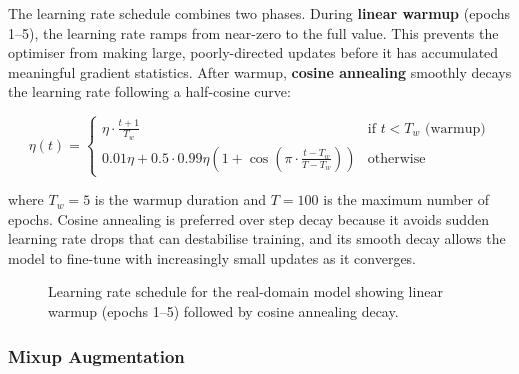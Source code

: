 \documentclass[12pt, a4paper]{article}
\begin{document}
The learning rate schedule combines two phases.  During \textbf{linear warmup}
(epochs 1--5), the learning rate ramps from near-zero to the full value.  This
prevents the optimiser from making large, poorly-directed updates before it has
accumulated meaningful gradient statistics.  After warmup, \textbf{cosine
annealing} smoothly decays the learning rate following a half-cosine curve:

\begin{equation}
\eta(t) =
\begin{cases}
\eta \cdot \frac{t+1}{T_w} & \text{if } t < T_w \text{ (warmup)} \\[4pt]
0.01\eta + 0.5 \cdot 0.99\eta \left(1 + \cos\left(\pi \cdot \frac{t - T_w}{T - T_w}\right)\right) & \text{otherwise}
\end{cases}
\label{eq:lr_schedule}
\end{equation}

where $T_w = 5$ is the warmup duration and $T = 100$ is the maximum number of
epochs.  Cosine annealing is preferred over step decay because it avoids sudden
learning rate drops that can destabilise training, and its smooth decay allows
the model to fine-tune with increasingly small updates as it converges.

\begin{figure}[H]
\centering
{}
\caption{Learning rate schedule for the real-domain model showing linear warmup
(epochs 1--5) followed by cosine annealing decay.}
\label{fig:lr_schedule}
\end{figure}

\subsubsection{Mixup Augmentation}
\end{document}

